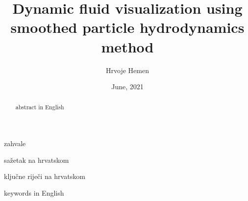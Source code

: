 \documentclass[diplomskirad]{fer}
\title{Dynamic fluid visualization using smoothed particle hydrodynamics method}
\author{Hrvoje Hemen}
\date{June, 2021}
\begin{document}
    \maketitle
    \begin{zahvale}
        zahvale
    \end{zahvale}
    \mainmatter
    \tableofcontents
    
    \begin{sazetak}
        sažetak na hrvatskom
    \end{sazetak}
    \begin{kljucnerijeci}
        ključne riječi na hrvatskom
    \end{kljucnerijeci}
    \begin{abstract}
        abstract in English
    \end{abstract}
    \begin{keywords}
        keywords in English
    \end{keywords}
\end{document}
